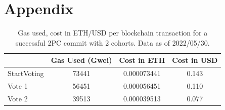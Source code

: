 \documentclass[11pt,conference]{IEEEtran}
\begin{document}
\section{Appendix} \label{appendix}
\begin{table}[hbtp]
     	\centering
     	\caption{Gas used, cost in ETH/USD per blockchain transaction for a successful 2PC commit with 2 cohorts. Data as of 2022/05/30.}
     	\label{table:cost}
     	\begin{tabular}{|l|c|c|c|}
     		\hline
     		  & Gas Used (Gwei) &  Cost in ETH & Cost in USD \\
     		\hline
     		StartVoting &73441 &0.000073441 & 0.143\\
     		\hline
     		Vote 1 &56451	&0.000056451 &0.110\\
     		\hline
     		Vote 2 &39513 &0.000039513 &0.077\\
     		\hline
     	\end{tabular}
     \end{table}
\end{document}
